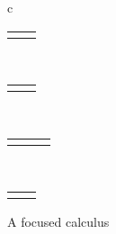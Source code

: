 \begin{figure}[H]
\begin{center}
{\begin{tabular}{c}
        \\[2em]
        \begin{tabular}{cc}
          \PTopPRRule
          &
          \hspace{0em}
          \PTopPLRule
        \end{tabular}
        \\[2em]
        \begin{tabular}{cc}
          \PImpRRule
          &
          \hspace{0em}
          \PImpLRule
        \end{tabular}
        \\[2em]
        \begin{tabular}{ccc}
          \POrRaRule
          &
          \hspace{0em}
          \POrRbRule
          &
          \hspace{0em}
          \POrLRule
        \end{tabular}
        \\[2em]
        \begin{tabular}{cc}
          \PBotLRule
          &
          \hspace{0em}
          \PBotRRule
        \end{tabular}
      \end{tabular}
    }
  \end{center}
  \caption{A focused calculus}
  \label{prop.focus}
\end{figure}


